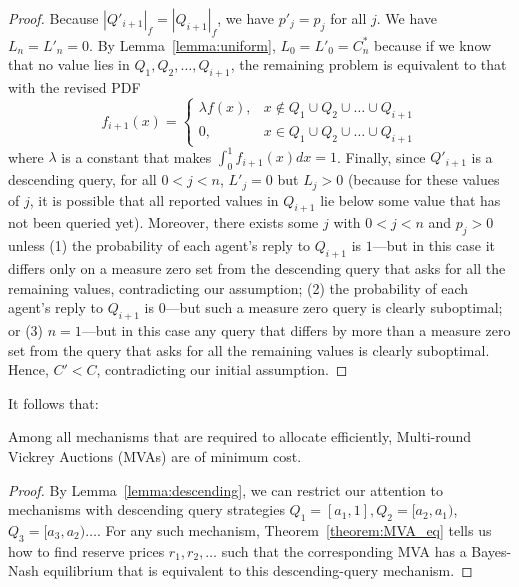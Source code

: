 \begin{proof}
Because $|Q'_{i+1}|_f = |Q_{i+1}|_f$,
we have $p'_j = p_j$
for all $j$.  We have $L_n = L'_n = 0$.
By Lemma~\ref{lemma:uniform},
$L_0 = L'_0 = C^*_n$ 
because if we know that no value lies in $Q_1, Q_2, \ldots, Q_{i+1}$, the
remaining problem  is equivalent to that with the revised PDF
\[
f_{i+1}(x) = \begin{cases}
	\lambda f(x), & x \notin Q_1 \cup Q_2 \cup \ldots \cup Q_{i+1} \\
	0, & x \in Q_1 \cup Q_2 \cup \ldots \cup Q_{i+1}
\end{cases}
\]
where $\lambda$ is a constant that makes $\int_0^1 f_{i+1}(x) dx = 1$.
Finally, since $Q'_{i+1}$ is a descending query, for all $0 < j < n$,
$L'_j = 0$ but $L_j > 0$ (because for these values of $j$, it is possible
that all reported values in $Q_{i+1}$ lie below some value that has not
been queried yet).  Moreover, there exists some $j$ with $0 < j < n$ and
$p_j > 0$ unless (1) the probability of each agent's reply to $Q_{i+1}$ is
$1$---but in this case it differs only on a measure zero set from the
descending query that asks for all the remaining values, contradicting our
assumption; (2) the probability of each agent's reply to $Q_{i+1}$ is
$0$---but such a measure zero query is clearly suboptimal;
or (3) $n=1$---but in this case any query that differs by more
than a measure zero set from the query that asks for all the remaining
values is clearly suboptimal.
Hence, $C' < C$, contradicting our initial assumption.
\end{proof}

It follows that:


\begin{theorem}\label{theorem:MVA_eq}
Among all mechanisms
that are
required to allocate efficiently,
Multi-round Vickrey Auctions (MVAs) are of minimum cost.
\end{theorem}

\begin{proof}
By Lemma~\ref{lemma:descending}, we can restrict our attention to
mechanisms with  descending query strategies
$Q_1 = [a_1, 1], Q_2 = [a_2, a_1)$, $Q_3 = [a_3, a_2) \ldots$.
For any such mechanism, Theorem~\ref{theorem:MVA_eq} tells us how to find reserve prices $r_1, r_2,
\ldots$ such that the corresponding MVA has a Bayes-Nash equilibrium that
is equivalent to this descending-query mechanism.
\end{proof}

